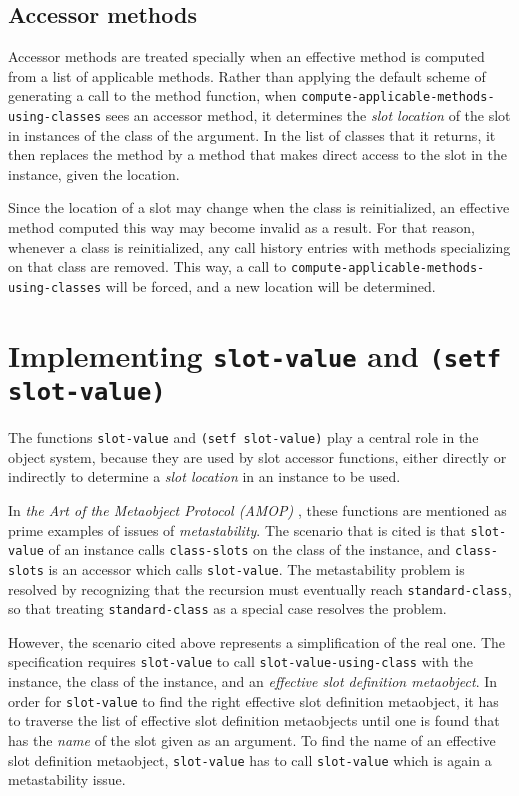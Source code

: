 \subsection{Accessor methods}
\label{sec-generic-function-dispatch-accessor-methods}

Accessor methods are treated specially when an effective method is
computed from a list of applicable methods.  Rather than applying the
default scheme of generating a call to the method function, when
\texttt{compute-applicable-methods-using-classes} sees an accessor
method, it determines the \emph{slot location} of the slot in
instances of the class of the argument.  In the list of classes that
it returns, it then replaces the method by a method that makes direct
access to the slot in the instance, given the location.  

Since the location of a slot may change when the class is
reinitialized, an effective method computed this way may become
invalid as a result.  For that reason, whenever a class is
reinitialized, any call history entries with methods specializing on
that class are removed.  This way, a call to
\texttt{compute-applicable-methods-using-classes} will be forced, and
a new location will be determined. 

\section{Implementing \texttt{slot-value} and \texttt{(setf slot-value)}}

The functions \texttt{slot-value} and \texttt{(setf slot-value)} play
a central role in the object system, because they are used by slot
accessor functions, either directly or indirectly to determine a
\emph{slot location} in an instance to be used.  

In \emph{the Art of the Metaobject Protocol (AMOP)}
\cite{Kiczales:1991:AMP:574212}, these functions are mentioned as
prime examples of issues of \emph{metastability}.  The scenario that
is cited is that \texttt{slot-value} of an instance calls
\texttt{class-slots} on the class of the instance, and
\texttt{class-slots} is an accessor which calls \texttt{slot-value}.
The metastability problem is resolved by recognizing that the
recursion must eventually reach \texttt{standard-class}, so that
treating \texttt{standard-class} as a special case resolves the
problem.

However, the scenario cited above represents a simplification of the
real one.  The specification requires \texttt{slot-value} to call
\texttt{slot-value-using-class} with the instance, the class of the
instance, and an \emph{effective slot definition metaobject}.  In
order for \texttt{slot-value} to find the right effective slot
definition metaobject, it has to traverse the list of effective slot
definition metaobjects until one is found that has the \emph{name} of
the slot given as an argument.  To find the name of an effective slot
definition metaobject, \texttt{slot-value} has to call
\texttt{slot-value} which is again a metastability issue. 

